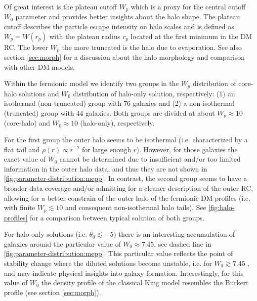 Of great interest is the plateau cutoff $W_p$ which is a proxy for the central cutoff $W_0$ parameter and provides better insights about the halo shape. The plateau cutoff describes the particle escape intensity on halo scales and is defined as $W_p = W(r_p)$ with the plateau radius $r_p$ located at the first minimum in the DM RC. The lower $W_p$ the more truncated is the halo due to evaporation. See also section \ref{sec:morph} for a discussion about the halo morphology and comparison with other DM models.

Within the fermionic model we identify two groups in the $W_p$ distribution of core-halo solutions and $W_0$ distribution of halo-only solution, respectively: (1) an isothermal (non-truncated) group with 76 galaxies and (2) a non-isothermal (truncated) group with 44 galaxies. Both groups are divided at about $W_p \approx 10$ (core-halo) and $W_0 \approx 10$ (halo-only), respectively.

For the first group the outer halo seems to be isothermal (i.e. characterized by a flat tail and $\rho(r) \propto r^{-2}$ for large enough $r$). However, for those galaxies the exact value of $W_0$ cannot be determined due to insufficient and/or too limited information in the outer halo data, and thus they are not shown in \cref{fig:parameter-distribution:mepp}. In contrast, the second group seems to have a broader data coverage and/or admitting for a cleaner description of the outer RC, allowing for a better constrain of the outer halo of the fermionic DM profiles (i.e. with finite $W_p \lesssim 10$ and consequent non-isothermal halo tails). See \cref{fig:halo-profiles} for a comparison between typical solution of both groups.

For halo-only solutions (i.e. $\theta_0 \lesssim -5)$ there is an interesting accumulation of galaxies around the particular value of $W_0 \approx 7.45$, see dashed line in \cref{fig:parameter-distribution:mepp}. This particular value reflects the point of stability change where the diluted solutions become unstable, i.e. for $W_0 \gtrsim 7.45$ \citep{2015PhRvD..91f3531C}, and may indicate physical insights into galaxy formation. Interestingly, for this value of $W_0$ the density profile of the classical King model resembles the Burkert profile (see section \ref{sec:morph}). %

